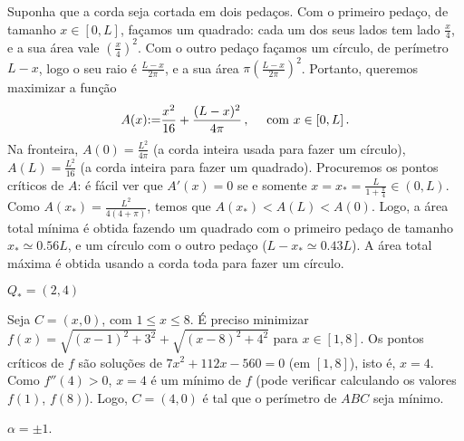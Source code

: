 \begin{Solution}{7.8}
Suponha que a corda seja cortada em dois pedaços. Com o primeiro pedaço, de
tamanho $x\in [0,L]$, façamos um quadrado: cada um dos seus lados tem lado
$\frac{x}{4}$, e a sua área vale $(\frac{x}{4})^2$. Com o outro pedaço façamos
um círculo, de perímetro $L-x$, logo o seu raio é $\frac{L-x}{2\pi}$, e a sua
área $\pi(\frac{L-x}{2\pi})^2$. Portanto, queremos maximizar a função
$$
A(x){:=} \frac{x^2}{16}+\frac{(L-x)^2}{4\pi}\,,\quad \text{ com }x\in
[0,L]\,.
$$
Na fronteira, $A(0)=\frac{L^2}{4\pi}$ (a corda inteira usada para fazer um
círculo), $A(L)=\frac{L^2}{16}$ (a corda inteira para fazer um quadrado).
Procuremos os pontos críticos de $A$: é fácil ver que $A'(x)=0$ se e somente
$x=x_*=\frac{L}{1+\frac{\pi }{4}}\in (0,L)$.
Como $A(x_*)=\frac{L^2}{4(4+\pi)}$, temos que $A(x_*)<A(L)<A(0)$. Logo,
a área total mínima é obtida fazendo um quadrado com o primeiro pedaço de
tamanho $x_*\simeq 0.56 L$, e  um círculo com o outro pedaço ($L-x_*\simeq
0.43 L$). A área total máxima é obtida usando a corda toda para fazer um
círculo.
\end{Solution}
\begin{Solution}{7.9}
$Q_*=(2,4)$
\end{Solution}
\begin{Solution}{7.10}
Seja $C=(x,0)$, com $1\leq x\leq 8$. É preciso minimizar
$f(x)=\sqrt{(x-1)^2+3^2}+\sqrt{(x-8)^2+4^2}$
para $x\in [1,8]$.
Os pontos críticos de $f$ são soluções de $7x^2+112x-560=0$ (em $[1,8]$), isto é,
$x=4$. Como $f''(4)>0$, $x=4$ é um mínimo de $f$ (pode verificar calculando os
valores $f(1)$, $f(8)$).
Logo, $C=(4,0)$ é tal que o perímetro de $ABC$ seja mínimo.
\end{Solution}
\begin{Solution}{7.11}
$\alpha=\pm 1$.
\end{Solution}
